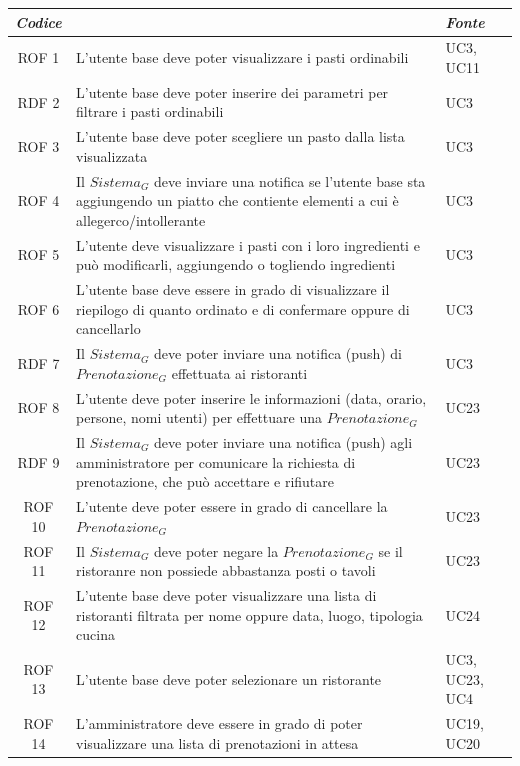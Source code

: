 \documentclass[12pt, oneside]{article}
\begin{document}
\begin{longtable}{|c|p{14cm}|p{2cm}|}
    \hline
    \emph{Codice} & \centering{\emph{Descrizione}} &  \emph{Fonte} \\
    \hline
    \endfirsthead
    \endhead
    ROF 1 & L'utente base deve poter visualizzare i pasti ordinabili & UC3, UC11\\
    \hline
    RDF 2 & L'utente base deve poter inserire dei parametri per filtrare i pasti ordinabili  & UC3 \\
    \hline
    ROF 3 & L'utente base deve poter scegliere un pasto dalla lista visualizzata & UC3 \\
    \hline
    ROF 4 & Il $\textit{Sistema}_G$ deve inviare una notifica se l'utente base sta aggiungendo un piatto che contiente elementi a cui è allegerco/intollerante & UC3\\
    \hline
    ROF 5 & L'utente deve visualizzare i pasti con i loro ingredienti e può modificarli, aggiungendo o togliendo ingredienti & UC3\\
    \hline
    ROF 6 & L'utente base deve essere in grado di visualizzare il riepilogo di quanto ordinato e di confermare oppure di cancellarlo & UC3 \\
    \hline
    RDF 7 & Il $\textit{Sistema}_G$ deve poter inviare una notifica (push) di $\textit{Prenotazione}_G$ effettuata ai ristoranti& UC3 \\
    \hline
    ROF 8 & L'utente deve poter inserire le informazioni (data, orario, persone, nomi utenti) per effettuare una $\textit{Prenotazione}_G$ & UC23\\
    \hline
    RDF 9 & Il $\textit{Sistema}_G$ deve poter inviare una notifica (push) agli amministratore per comunicare la richiesta di prenotazione, che può accettare e rifiutare & UC23\\
    \hline
    ROF 10 & L'utente deve poter essere in grado di cancellare la $\textit{Prenotazione}_G$ & UC23 \\
    \hline
    ROF 11 & Il $\textit{Sistema}_G$ deve poter negare la $\textit{Prenotazione}_G$ se il ristoranre non possiede abbastanza posti o tavoli & UC23 \\
    \hline
    ROF 12 & L'utente base deve poter visualizzare una lista di ristoranti filtrata per nome oppure data, luogo, tipologia cucina & UC24 \\
    \hline
    ROF 13 & L'utente base deve poter selezionare un ristorante  & UC3, UC23, UC4\\
    \hline
    ROF 14 & L'amministratore deve essere in grado di poter visualizzare una lista di prenotazioni in attesa & UC19, UC20 \\

\end{longtable}
\end{document}
